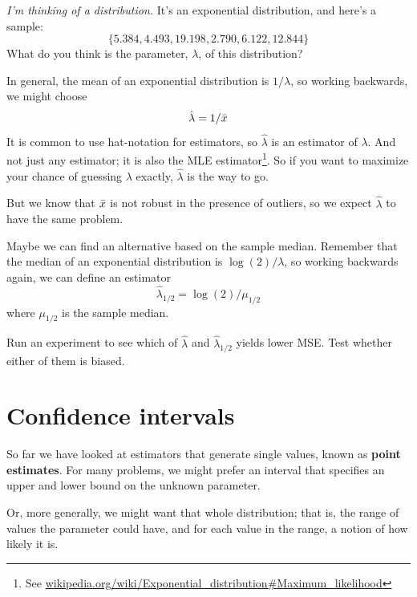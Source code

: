 \documentclass[12pt]{book}
\begin{document}
{\em I'm thinking of a distribution.}  It's an exponential distribution, and 
here's a sample:
%
\[ \{ 5.384, 4.493, 19.198, 2.790, 6.122, 12.844 \} \]
%
What do you think is the parameter, $\lambda$, of this distribution?

\newcommand{\lamhat}{\hat{\lambda}}
\newcommand{\lamhatmed}{\hat{\lambda}_{1/2}}

In general, the mean of an exponential distribution is $1 / \lambda$,
so working backwards, we might choose
%
\[ \lamhat = 1 / \xbar \]
%
It is common to use hat-notation for estimators, so $\lamhat$ is an
estimator of $\lambda$.  And not just any estimator; it is also the
MLE estimator\footnote{See
\url{wikipedia.org/wiki/Exponential_distribution#Maximum_likelihood}}.
So if you want to maximize your chance of guessing $\lambda$ exactly,
$\lamhat$ is the way to go.

But we know that $\bar{x}$ is not robust in the presence of outliers, so
we expect $\lamhat$ to have the same problem.

Maybe we can find an alternative based on the sample median.  Remember
that the median of an exponential distribution is $\log(2) / \lambda$,
so working backwards again, we can define an estimator
%
\[ \lamhatmed = \log(2) / \mu_{1/2} \]
%
where $\mu_{1/2}$ is the sample median.

\begin{ex}

Run an experiment to see which of $\lamhat$ and $\lamhatmed$ yields
lower MSE.  Test whether either of them is biased.


\end{ex}


\section{Confidence intervals}

So far we have looked at estimators that generate single values, known
as {\bf point estimates}.  For many problems, we might prefer an interval
that specifies an upper and lower bound on the unknown parameter.

Or, more generally, we might want that whole distribution; that is,
the range of values the parameter could have, and for each value in
the range, a notion of how likely it is.
\end{document}
